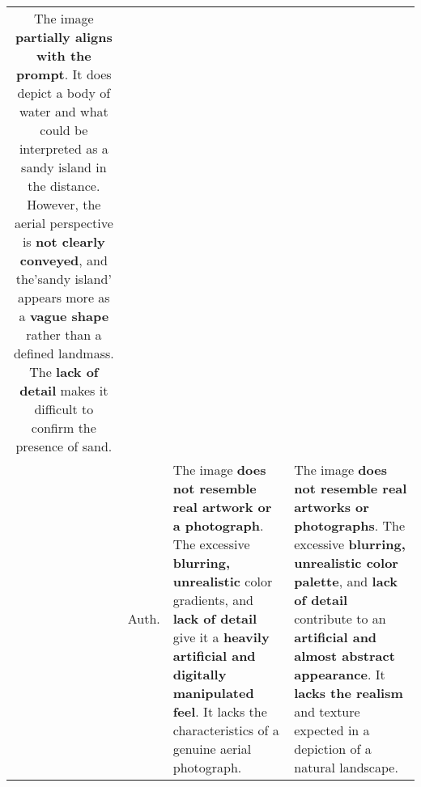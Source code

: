 \begin{table*}
\begin{tabular}{c m{0.8cm} m{5.2cm}m{5.2cm}}
        The image \textbf{partially aligns with the prompt}. It does depict a body of water and what could be interpreted as a sandy island in the distance. However, the aerial perspective is \textcolor{negative}{\textbf{not clearly conveyed}}, and the'sandy island' appears more as a \textcolor{negative}{\textbf{vague shape}} rather than a defined landmass. The \textcolor{negative}{\textbf{lack of detail}} makes it difficult to confirm the presence of sand. \\
        \cline{2-4}
        & Auth. & The image \textcolor{negative}{\textbf{does not resemble real artwork or a photograph}}. The excessive \textbf{blurring, unrealistic} color gradients, and \textcolor{negative}{\textbf{lack of detail}} give it a \textcolor{negative}{\textbf{heavily artificial and digitally manipulated feel}}. It lacks the characteristics of a genuine aerial photograph. &
        The image \textcolor{negative}{\textbf{does not resemble real artworks or photographs}}. The excessive \textcolor{negative}{\textbf{blurring, unrealistic color palette}}, and \textbf{lack of detail} contribute to an \textcolor{negative}{\textbf{artificial and almost abstract appearance}}. It \textcolor{negative}{\textbf{lacks the realism}} and texture expected in a depiction of a natural landscape. \\
        \bottomrule
    \end{tabular}
\end{table*}
